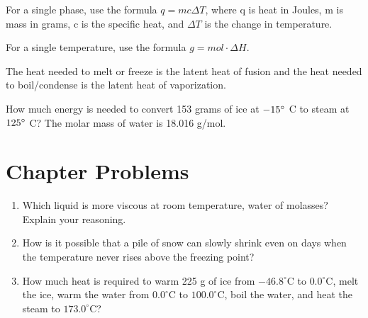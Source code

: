 \documentclass[../hchem.tex]{subfiles}
\begin{document}
For a single phase, use the formula $q=mc\Delta T$, where q is heat in Joules, m is mass in grams, c is the specific heat, and $\Delta T$ is the change in temperature.

For a single temperature, use the formula $g= mol\cdot\Delta H$.

The heat needed to melt or freeze is the latent heat of fusion and the heat needed to boil/condense is the latent heat of vaporization.

\ex How much energy is needed to convert 153 grams of ice at $-15\degree$ C to steam at $125\degree$ C? The molar mass of water is 18.016 g/mol.

\section*{Chapter Problems}
\begin{enumerate}
    \item Which liquid is more viscous at room temperature, water of molasses? Explain your reasoning.
    \item How is it possible that a pile of snow can slowly shrink even on days when the temperature never rises above the freezing point?
    \item How much heat is required to warm 225 g of ice from $-46.8^{\circ}$C to $0.0^{\circ}$C, melt the ice, warm the water from $0.0^{\circ}$C to $100.0^{\circ}$C, boil the water, and heat the steam to $173.0^{\circ}$C?
\end{enumerate}
\end{document}
